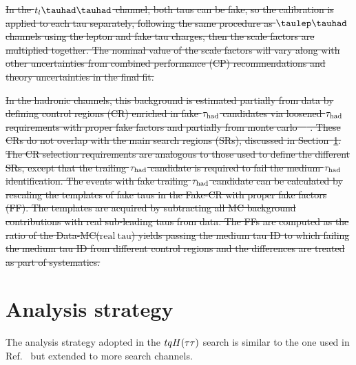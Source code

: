 \documentclass[PAPER, coverpage, atlasdraft=true, texlive=2016, UKenglish]{\ATLASLATEXPATH atlasdoc}
\providecommand{\DIFdel}[1]{{\protect\color{red}\sout{#1}}}                      %
\providecommand{\DIFdelend}{} %
\begin{document}
\DIFdel{In the $t_l\thadhad$ channel, both taus can be fake, so the calibration is applied to each tau separately, following the same procedure as $\tlhad$ channels using the
lepton and fake tau charges, then the scale factors are multiplied together. The nominal value of the scale factors will vary along with other uncertainties from
combined performance (CP) recommendations and theory uncertainties in the final fit.
}%

\DIFdel{In the hadronic channels, this background is estimated partially from data by defining control regions (CR) enriched in fake $\tau_{\mathrm{had}}$
candidates via loosened $\tau_{\mathrm{had}}$ requirements with proper fake factors and partially from monte carlo~\mbox{%
\cite{ATLAS-CONF-2021-044}}\hspace{0pt}%
.
These CRs do not overlap with the main search regions (SRs), discussed in Section~\ref{sec:strategy_Htautau}.
The CR selection requirements are analogous to those used to define the different SRs, except
that the trailing $\tau_{\mathrm{had}}$ candidate is required to fail the medium $\tau_{\mathrm{had}}$ identification.
The events with fake trailing $\tau_{\mathrm{had}}$ candidate can be calculated by rescaling the templates of fake taus in the Fake-CR with proper fake factors (FF).
The templates are acquired by subtracting all MC background contributions with real sub-leading taus from data. The FFs are computed as
the ratio of the Data-MC($\mathrm{real~tau}$) yields passing the medium tau ID to which failing the medium tau ID from different control regions and
the differences are treated as part of systematics.
}%

\DIFdelend %
\section{Analysis strategy}
\label{sec:strategy_Htautau}

The analysis strategy adopted in the $tqH(\tau\tau)$ search is similar to the one used in Ref.~\cite{fcnc36,Chen:2015nta} but extended to more search channels.
\end{document}
